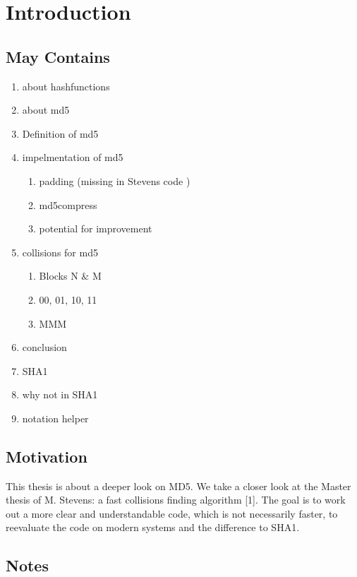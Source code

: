 \chapter{Introduction}
\section{May Contains}
\begin{enumerate}

    \item about hashfunctions
    \item about md5
    \item Definition of md5
    \item impelmentation of md5
        \begin{enumerate}
            \item padding (missing in Stevens code )
            \item md5compress
            \item potential for improvement 
        \end{enumerate}
    \item collisions for md5
        \begin{enumerate}
            \item Blocks N $\&$ M
            \item 00, 01, 10, 11
            \item MMM
        \end{enumerate}
    \item conclusion
    \item SHA1
    \item why not in SHA1
    \item notation helper

\end{enumerate}
\section*{Motivation}
This thesis is about a deeper look on MD5.
We take a closer look at the Master thesis of M. Stevens: a fast collisions finding algorithm [1].
The goal is to work out a more clear and understandable code, which is not necessarily faster, to reevaluate the code on modern systems and the difference to SHA1. 


\section*{Notes}
 
